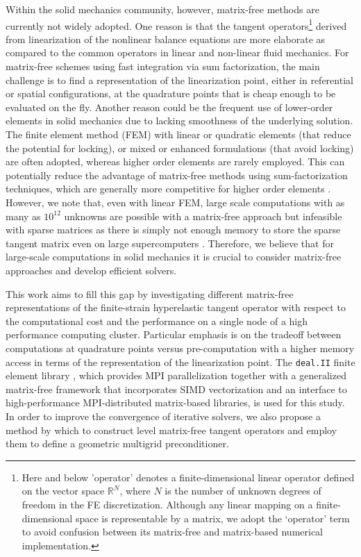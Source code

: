 \documentclass[AMA,STIX1COL]{WileyNJD-v2}
\begin{document}
Within the solid mechanics community, however, matrix-free methods are currently not widely adopted.
One reason is that the tangent operators\footnote{Here and
below 'operator' denotes a finite-dimensional linear operator defined on the vector space $\mathbb R^N$, where $N$ is the number of unknown degrees of freedom in the FE discretization.
Although any linear mapping on a finite-dimensional space is representable by a matrix, we adopt the `operator' term to avoid confusion between its matrix-free and matrix-based numerical implementation.
} derived from linearization of the nonlinear balance equations are
more elaborate as compared to the common operators in linear and non-linear fluid mechanics.
{\color{red}
For matrix-free schemes using fast integration via sum factorization, the main challenge is to find a representation of the linearization point, either in referential or spatial configurations, at the quadrature points that is cheap enough to be evaluated on the fly.
}
Another reason could be the frequent use of lower-order elements in solid mechanics due to lacking smoothness of the underlying solution.
The finite element method (FEM) with linear or quadratic elements (that reduce the potential for locking), or mixed or enhanced formulations (that avoid locking) are often adopted,
whereas higher order elements are rarely employed.
This can potentially reduce the advantage of matrix-free methods using sum-factorization techniques, which are generally more competitive for higher order elements \cite{kronbichler12,kronbichler2017fast,muthing2017high,Fischer2019}.
However, we note that, even with linear FEM, large scale computations with as many as $10^{12}$ unknowns are possible with a matrix-free approach but infeasible with sparse matrices as there is simply not enough memory to store the sparse tangent matrix even on large supercomputers \cite{Gmeiner2016}. Therefore, we believe that for large-scale computations in solid mechanics it is crucial to consider matrix-free approaches and develop efficient solvers.

{\color{red}
This work aims to fill this gap by investigating different matrix-free representations of the
finite-strain hyperelastic tangent operator with respect to the computational cost
and the performance on a single node of a high performance computing cluster.
Particular emphasis is on the tradeoff between computations at quadrature points versus
pre-computation with a higher memory access in terms of the representation of the linearization point.
The \texttt{deal.II} finite element library \cite{dealII90}, which provides MPI parallelization together with a generalized matrix-free framework that incorporates SIMD vectorization and an interface to high-performance MPI-distributed matrix-based libraries, is used for this study.
In order to improve the convergence of iterative solvers, we also propose a method by which to construct level matrix-free tangent operators
and employ them to define a \mbox{geometric} multigrid preconditioner.
}
\end{document}

